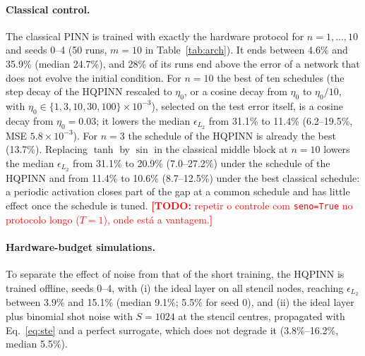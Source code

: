 \documentclass[floatfix,aps,pra,twocolumn,superscriptaddress,10pt,nofootinbib]{revtex4-2}
\newif\ifshowtodos \showtodostrue
\newcommand{\TODO}[1]{\ifshowtodos\textcolor{red}{\textbf{[TODO:} #1\textbf{]}}\fi}
\begin{document}
\begin{appendices}
\paragraph{Classical control.} The classical PINN is trained with exactly the hardware protocol for $n=1,\dots,10$ and seeds 0--4 (50 runs, $m=10$ in Table~\ref{tab:arch}). It ends between 4.6\% and 35.9\% (median 24.7\%), and 28\% of its runs end above the error of a network that does not evolve the initial condition. For $n=10$ the best of ten schedules (the step decay of the HQPINN rescaled to $\eta_0$, or a cosine decay from $\eta_0$ to $\eta_0/10$, with $\eta_0\in\{1,3,10,30,100\}\times10^{-3}$), selected on the test error itself, is a cosine decay from $\eta_0=0.03$; it lowers the median $\epsilon_{L_2}$ from 31.1\% to 11.4\% (6.2--19.5\%, MSE $5.8\times10^{-3}$). For $n=3$ the schedule of the HQPINN is already the best (13.7\%). Replacing $\tanh$ by $\sin$ in the classical middle block at $n=10$ lowers the median $\epsilon_{L_2}$ from 31.1\% to 20.9\% (7.0--27.2\%) under the schedule of the HQPINN and from 11.4\% to 10.6\% (8.7--12.5\%) under the best classical schedule: a periodic activation closes part of the gap at a common schedule and has little effect once the schedule is tuned. \TODO{repetir o controle com \texttt{seno=True} no protocolo longo ($T=1$), onde est\'a a vantagem.}

\paragraph{Hardware-budget simulations.} To separate the effect of noise from that of the short training, the HQPINN is trained offline, seeds 0--4, with (i) the ideal layer on all stencil nodes, reaching $\epsilon_{L_2}$ between 3.9\% and 15.1\% (median 9.1\%; 5.5\% for seed 0), and (ii) the ideal layer plus binomial shot noise with $S=1024$ at the stencil centres, propagated with Eq.~\eqref{eq:ste} and a perfect surrogate, which does not degrade it (3.8\%--16.2\%, median 5.5\%).


\end{appendices}
\end{document}
